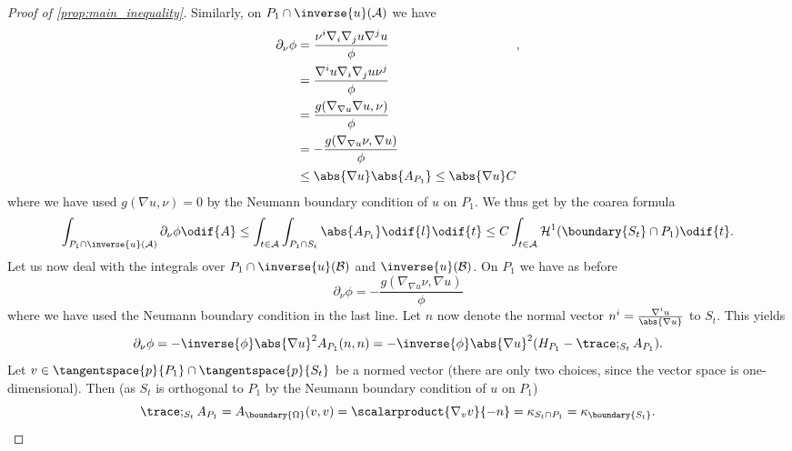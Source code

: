 \documentclass[titlepage,numbers=noenddot,oneside,%
cleardoublepage=empty,paper=a4,fontsize=11pt,%
english,%
]{scrartcl}
\begin{document}
{\begin{proof}[Proof of \cref{prop:main_inequality}]
    Similarly, on \( P_1\cap \inverse{u}(\mathcal{A}) \) we have 
    \begin{equation*}
        \begin{aligned}[t]
            \partial_{\nu}\phi&=\frac{\nu^i\nabla_i\nabla_j u \nabla^j u}{\phi}\\ 
            &=\frac{\nabla^i u \nabla_i \nabla_j u \nu^j}{\phi}\\
            &=\frac{g(\nabla_{\nabla u}\nabla u,\nu)}{\phi}\\
            &=-\frac{g(\nabla_{\nabla u}\nu,\nabla u)}{\phi}\\
            &\leq \abs{\nabla u}\abs{A_{P_1}}\leq \abs{\nabla u}C
        \end{aligned},
    \end{equation*}
    where we have used \( g(\nabla u,\nu)=0 \) by the Neumann boundary condition of \( u \) on \( P_1 \). We thus get by the coarea formula
    \begin{equation*}
        \int_{P_1\cap \inverse{u}(\mathcal{A})}\partial_{\nu} \phi\odif{A}\leq \int_{t\in \mathcal{A}}\int_{P_1\cap S_t}\abs{A_{P_1}}\odif{l}\odif{t}\leq C\int_{t\in \mathcal{A}}\mathcal{H}^1(\boundary{S_t}\cap P_1)\odif{t}.
    \end{equation*}
    Let us now deal with the integrals over \( P_1\cap \inverse{u}(\mathcal{B}) \) and \( \inverse{u}(\mathcal{B}) \). On \( P_1 \) we have as before
    \begin{equation*}
        \partial_\nu \phi=-\frac{g(\nabla_{\nabla u}\nu,\nabla u)}{\phi}
    \end{equation*}
    where we have used the Neumann boundary condition in the last line. Let \( n \) now denote the normal vector \( n^i=\frac{\nabla^i u}{\abs{\nabla u}} \) to \( S_t \). This yields
    \begin{equation*}
        \partial_\nu\phi=-\inverse{\phi}\abs{\nabla u}^2A_{P_1}(n,n)=-\inverse{\phi}\abs{\nabla u}^2(H_{P_1}-\trace;_{S_t}A_{P_1}).
    \end{equation*}
    Let \( v\in \tangentspace{p}{P_1}\cap\tangentspace{p}{S_t} \) be a normed vector (there are only two choices, since the vector space is one-dimensional). Then (as \( S_t \) is orthogonal to \( P_1 \) by the Neumann boundary condition of \( u \) on \( P_1 \))
    \begin{equation*}
        \trace;_{S_t}A_{P_1}=A_{\boundary{\Omega}}(v,v)=\scalarproduct{\nabla_{v}v}{-n}=\kappa_{S_t\cap P_1}=\kappa_{\boundary{S_t}}.
    \end{equation*}

\end{proof}}
\end{document}
